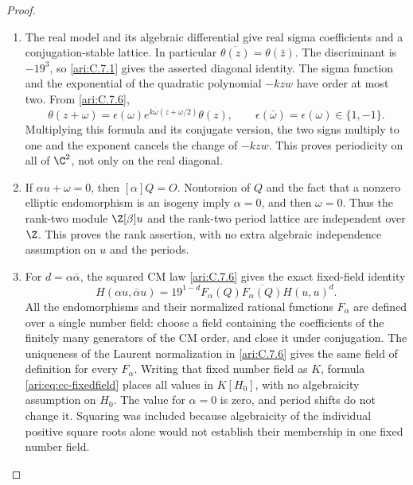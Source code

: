 \begin{proof}
\begin{enumerate}[label=\arabic*.,leftmargin=*]
\item The real model and its algebraic differential give real sigma
coefficients and a conjugation-stable lattice. In particular
$\overline{\theta(z)}=\theta(\bar z)$. The discriminant is
$-19^3$, so \ref{ari:C.7.1} gives the asserted diagonal identity.
The sigma function and the exponential of the quadratic
polynomial $-kzw$ have order at most two. From \ref{ari:C.7.6},
\[
 \theta(z+\omega)=\epsilon(\omega)
         e^{k\bar\omega(z+\omega/2)}\theta(z),
 \qquad \epsilon(\bar\omega)=\epsilon(\omega)\in\{1,-1\}.
\]
Multiplying this formula and its conjugate version, the two
signs multiply to one and the exponent cancels the change of
$-kzw$. This proves periodicity on all of $\C^2$, not only
on the real diagonal.

\item If $\alpha u+\omega=0$, then $[\alpha]Q=O$.
Nontorsion of $Q$ and the fact that a nonzero elliptic
endomorphism is an isogeny imply $\alpha=0$, and then
$\omega=0$. Thus the rank-two module $\Z[\beta]u$ and the
rank-two period lattice are independent over $\Z$.
This proves the rank assertion, with no extra algebraic
independence assumption on $u$ and the periods.

\item For $d=\alpha\bar\alpha$, the squared CM law \ref{ari:C.7.6} gives
the exact fixed-field identity
\begin{equation}\label{ari:eq:cc-fixedfield}
 H(\alpha u,\bar\alpha u)
   =19^{1-d}F_\alpha(Q)\overline{F_\alpha(Q)}H(u,u)^d.
\end{equation}
All the endomorphisms and their normalized rational functions
$F_\alpha$ are defined over a single number field: choose
a field containing the coefficients of the finitely many
generators of the CM order, and close it under conjugation.
The uniqueness of the Laurent normalization in \ref{ari:C.7.6} gives
the same field of definition for every $F_\alpha$.
Writing that fixed number field as $K$, formula
\eqref{ari:eq:cc-fixedfield} places all values in $K[H_0]$,
with no algebraicity assumption on $H_0$.
The value for $\alpha=0$ is zero, and period shifts do not
change it. Squaring was included because algebraicity of the
individual positive square roots alone would not establish
their membership in one fixed number field.


\end{enumerate}
\end{proof}

